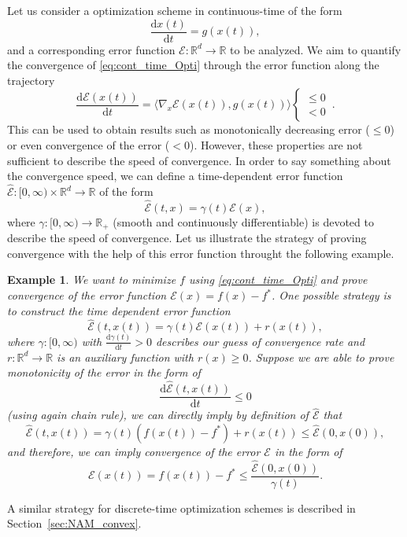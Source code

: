 \documentclass[12pt,openany]{book}
\newtheorem{example}[thm]{Example}
\theoremstyle{definition}
\theoremstyle{definition}
\newcommand{\R}{\mathbb{R}}
\newcommand{\dd}{{\mathrm{d}}}
\begin{document}
Let us consider a optimization scheme in continuous-time of the form
\begin{equation}\label{eq:cont_time_Opti}
\frac{\dd x(t)}{\dd t} = g(x(t)), 
\end{equation}
and a corresponding error function $\mathcal E:\R^d\to\R$ to be analyzed. We aim to quantify the convergence of \eqref{eq:cont_time_Opti} through the error function along the trajectory
\[\frac{\dd \mathcal E(x(t))}{\dd t} = \langle \nabla_x\mathcal E(x(t)), g(x(t))\rangle\begin{cases}\le 0\\ <0 \end{cases}\, . \]
This can be used to obtain results such as monotonically decreasing error ($\le 0$) or even convergence of the error ($<0$). However, these properties are not sufficient to describe the speed of convergence.  In order to say something about the convergence speed, we can define a time-dependent error function $\widehat{\mathcal E}:[0,\infty)\times\R^d\to\R$ of the form
\[\widehat{\mathcal E}(t,x) = \gamma(t) \mathcal E(x),\]
where $\gamma:[0,\infty)\to\R_+$ (smooth and continuously differentiable) is devoted to describe the speed of convergence.  Let us illustrate the strategy of proving convergence with the help of this error function throught the following example.


\begin{example}
We want to minimize $f$ using \eqref{eq:cont_time_Opti} and prove convergence of the error function $\mathcal E(x) = f(x)-f^\ast$. One possible strategy is to construct the time dependent error function \[\widehat{\mathcal E}(t,x(t)) = \gamma(t)\mathcal E(x(t))+r(x(t)), \]
where $\gamma:[0,\infty)$ with $\frac{\dd \gamma(t)}{\dd t}>0$ describes our guess of convergence rate and $r:\R^d\to\R$ is an auxiliary function with $r(x)\ge0$.  Suppose we are able to prove monotonicity of the error in the form of
\[\frac{\dd \widehat{\mathcal E}(t,x(t))}{\dd t} \le 0 \]
(using again chain rule), we can directly imply by definition of $\widehat{\mathcal E}$ that
\[\widehat{\mathcal E}(t,x(t)) = \gamma(t) (f(x(t))-f^\ast) + r(x(t)) \le \widehat{\mathcal E}(0,x(0)), \]
and therefore, we can imply convergence of the error $\mathcal E$ in the form of
\[\mathcal E(x(t))=f(x(t))-f^\ast \le \frac{\widehat{\mathcal E}(0,x(0))}{\gamma(t)}.\]
\end{example}

A similar strategy for discrete-time optimization schemes is described in Section~\ref{sec:NAM_convex}.
\end{document}
